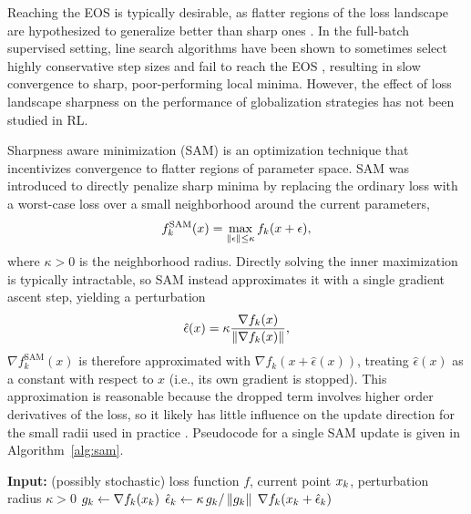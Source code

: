 Reaching the EOS is typically desirable, as flatter regions of the loss landscape are hypothesized to generalize better than sharp ones . In the full-batch supervised setting, line search algorithms have been shown to sometimes select highly conservative step sizes and fail to reach the EOS \cite{roulet2024stepping}, resulting in slow convergence to sharp, poor-performing local minima. However, the effect of loss landscape sharpness on the performance of globalization strategies has not been studied in RL.

Sharpness aware minimization (SAM) is an optimization technique that incentivizes convergence to flatter regions of parameter space. SAM was introduced to directly penalize sharp minima by replacing the ordinary loss with a worst-case loss over a small neighborhood around the current parameters,
\begin{equation}
    f_k^{\text{SAM}}(x) = \max_{\left \lVert \epsilon \right \rVert \le \kappa} f_k(x + \epsilon),
    \label{eq:sam_loss}
\end{equation}
where $\kappa > 0$ is the neighborhood radius. Directly solving the inner maximization is typically intractable, so SAM instead approximates it with a single gradient ascent step, yielding a perturbation
\begin{equation}
    \hat{\epsilon}(x) = \kappa \frac{\nabla f_k(x)}{\left \lVert \nabla f_k(x) \right \rVert},
    \label{eq:sam_epsilon}
\end{equation}
$\nabla f_k^{\text{SAM}}(x)$ is therefore approximated with $\nabla f_k(x + \hat{\epsilon}(x))$, treating $\hat{\epsilon}(x)$ as a constant with respect to $x$ (i.e., its own gradient is stopped). This approximation is reasonable because the dropped term involves higher order derivatives of the loss, so it likely has little influence on the update direction for the small radii used in practice .
Pseudocode for a single SAM update is given in Algorithm~\ref{alg:sam}.

\begin{algorithm}[htbp]
\caption{Sharpness-Aware Minimization (SAM)}
\label{alg:sam}
\begin{algorithmic}[1]
\State \textbf{Input:} (possibly stochastic) loss function $f$, current point $x_{k}$, perturbation radius $\kappa > 0$
\State $g_k \gets \nabla f_k(x_{k})$
\State $\hat{\epsilon}_k \gets \kappa\, g_k / \left \lVert g_k \right \rVert$ 
\State \Return $\nabla f_k(x_{k} + \hat{\epsilon}_k)$ 
\end{algorithmic}
\end{algorithm}


